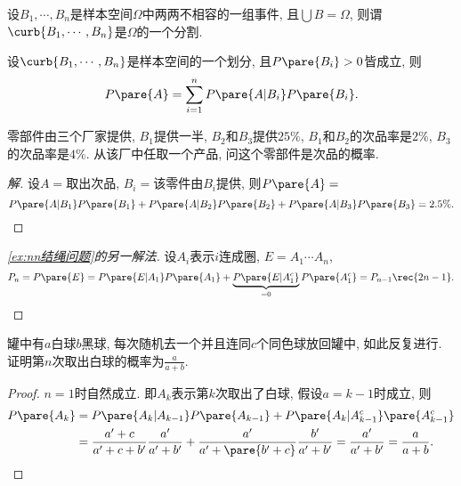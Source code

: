 \documentclass[../Statistics.tex]{subfiles}
\begin{document}
\begin{definition}[样本空间的划分]
    设$B_1,\cdots, B_n$是样本空间$\Omega$中两两不相容的一组事件, 且$\bigcup B = \Omega$, 则谓$\curb{B_1,\cdots, B_n}$是$\Omega$的一个分割.
\end{definition}
\begin{finale}
    \begin{theorem}[全概率公式]
        设$\curb{B_1,\cdots,B_n}$是样本空间的一个划分, 且$P\pare{B_i} > 0$皆成立, 则
        \[ P\pare{A} = \sum_{i=1}^n P\pare{A\vert B_i} P\pare{B_i}. \]
    \end{theorem}
\end{finale}
\begin{sample}
    \begin{ex}
        零部件由三个厂家提供, $B_1$提供一半, $B_2$和$B_3$提供$25\%$, $B_1$和$B_2$的次品率是$2\%$, $B_3$的次品率是$4\%$. 从该厂中任取一个产品, 问这个零部件是次品的概率.
    \end{ex}
    \begin{proof}[解]
        设$A=$取出次品, $B_i=$该零件由$B_i$提供, 则$P\pare{A} = $
        \[ P\pare{A\vert B_1}P\pare{B_1} + P\pare{A\vert B_2}P\pare{B_2} + P\pare{A\vert B_3}P\pare{B_3} = 2.5\%. \qedhere \]
\end{proof}
\end{sample}
\begin{sample}
    \begin{proof}[\cref{ex:nn结绳问题}的另一解法]
        设$A_i$表示$i$连成圈, $E=A_1\cdots A_n$,
        \[ P_n = P\pare{E} = P\pare{E\vert A_1}P\pare{A_1} + \underbrace{P\pare{E\vert A_1^c}}_{=0}P\pare{A_1^c} = P_{n-1}\rec{2n-1}.\qedhere \]
    \end{proof}
\end{sample}
\begin{sample}
    \begin{ex}[Polya罐子模型]
        罐中有$a$白球$b$黑球, 每次随机去一个并且连同$c$个同色球放回罐中, 如此反复进行. 证明第$n$次取出白球的概率为$\displaystyle \frac{a}{a+b}$.
    \end{ex}
    \begin{proof}
        $n=1$时自然成立. 即$A_k$表示第$k$次取出了白球, 假设$a=k-1$时成立, 则
        \begin{align*}
            P\pare{A_k} &= P\pare{A_k\vert A_{k-1}}P\pare{A_{k-1}} + P\pare{A_{k}\vert A_{k-1}^c}\pare{A_{k-1}^c}\\ &= \frac{a'+c}{a'+c+b'}\frac{a'}{a'+b'} + \frac{a'}{a'+\pare{b'+c}}\frac{b'}{a'+b'} = \frac{a'}{a'+b'} = \frac{a}{a+b}.\qedhere 
        \end{align*}
    \end{proof}
\end{sample}
\end{document}
